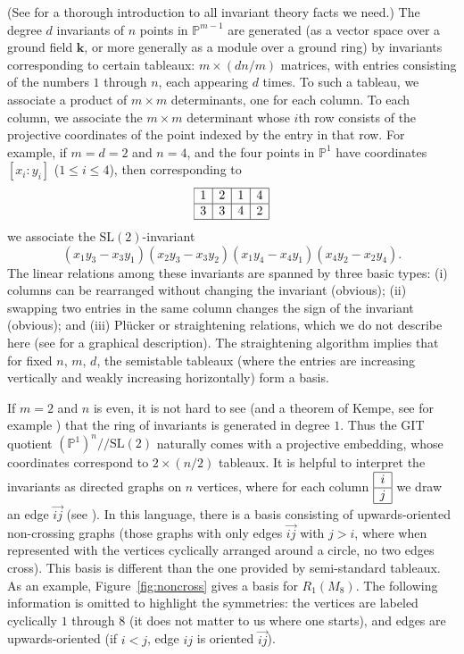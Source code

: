 \documentclass{amsart}
\theoremstyle{definition}
\theoremstyle{remark}
\def\SL{\mathrm{SL}}
\def\fieldk{\mathbf{k}}
\def\proj{\mathbb{P}}
\def\cq{/\!/}
\begin{document}
(See \cite{dolgachev} for a thorough introduction to all invariant theory facts we need.) The degree $d$ invariants of
$n$ points in $\proj^{m-1}$ are generated (as a vector space over a ground field $\fieldk$, or more generally as a
module over a ground ring) by invariants corresponding to certain tableaux:  $m \times (dn/m)$ matrices, with entries
consisting of the numbers $1$ through $n$, each appearing $d$ times.  To such a tableau, we associate a product of
$m \times m$ determinants, one for each column.  To each column, we associate the $m \times m$ determinant whose $i$th
row consists of the projective coordinates of the point indexed by the entry in that row.  For example, if $m=d=2$ and
$n=4$, and the four points in $\proj^1$ have coordinates $[x_i: y_i]$ ($1 \leq i \leq 4$), then corresponding to 
\begin{displaymath}
\begin{array}{|c|c|c|c|} \hline
1 & 2 & 1 & 4 \\  \hline
3 & 3 & 4 & 2 \\  \hline
\end{array}
\end{displaymath}
we associate the $\SL(2)$-invariant 
\begin{displaymath}
(x_1 y_3 - x_3 y_1) ( x_2 y_3 - x_3 y_2) (x_1 y_4 - x_4 y_1) (x_4 y_2- x_2 y_4).
\end{displaymath}
The linear relations among these invariants are spanned by three basic types:  (i) columns can be rearranged without
changing the invariant (obvious); (ii) swapping two entries in the same column changes the sign of the invariant
(obvious); and (iii) Pl\"ucker or straightening relations, which we do not describe here (see \cite[\S 1.3]{hmsv2} for
a graphical description).  The straightening algorithm implies that for fixed $n$, $m$, $d$, the semistable tableaux
(where the entries are increasing vertically and weakly increasing horizontally) form a basis.

If $m=2$ and $n$ is even, it is not hard to see (and a theorem of Kempe, see for example \cite[Thm.~2.3]{hmsv1}) that
the ring of invariants is generated in degree $1$.  Thus the GIT quotient $(\proj^1)^n \cq \SL(2)$ naturally comes with
a projective embedding, whose coordinates correspond to $2 \times
(n/2)$ tableaux.
It is helpful  to interpret the invariants as directed graphs on  $n$ vertices, where for each column
$\begin{array}{|c|} \hline
i\\  \hline
j\\  \hline
\end{array}$
we draw an edge $\vec{ij}$ (see \cite[\S 1.2]{hmsv2}).  In this language, there is a basis consisting of
upwards-oriented non-crossing graphs (those graphs with only edges $\vec{ij}$ with $j>i$, where when represented
with the vertices cyclically arranged around a circle, no two edges cross).  This basis is different than the one
provided by semi-standard tableaux.  As an example, Figure~\ref{fig:noncross} gives a basis for $R_1(M_8)$.
The following information is omitted to highlight the symmetries:  the vertices are
labeled cyclically $1$ through $8$ (it does not matter to us where one starts), and edges are upwards-oriented (if $i<j$,
edge $ij$ is oriented $\vec{ij}$).
\end{document}
